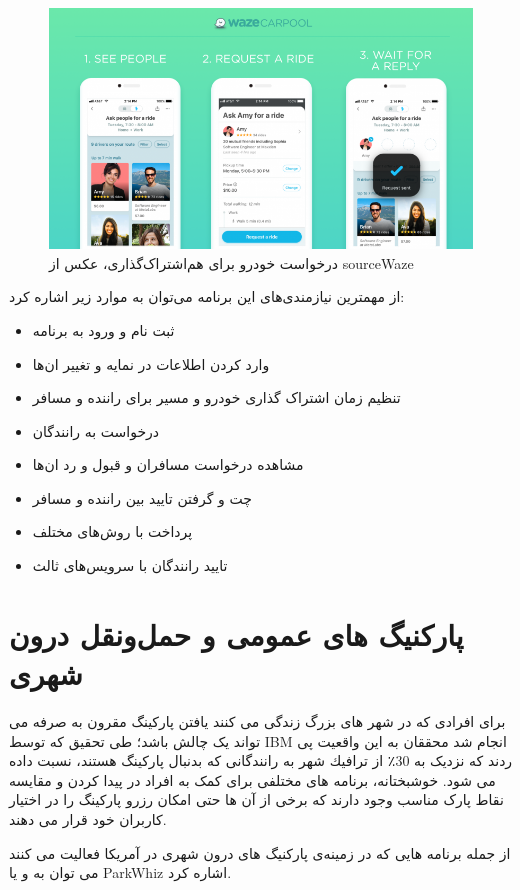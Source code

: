 \begin{figure}[hbt]
\centering
\includegraphics[scale=0.5]{waze1.png}
\caption{درخواست خودرو برای هم‌اشتراک‌گذاری، عکس از sourceWaze}
\label{fig: waze1}
\end{figure}

از مهمترین نیازمندی‌های این برنامه می‌توان به موارد زیر اشاره کرد:

\begin{itemize}
\item
ثبت نام و ورود به برنامه
\item
وارد کردن اطلاعات در نمایه و تغییر ان‌ها
\item
تنظیم زمان اشتراک گذاری خودرو و مسیر برای راننده و مسافر
\item
درخواست به رانندگان 
\item
مشاهده درخواست مسافران و قبول و رد ان‌ها 
\item
چت و گرفتن تایید بین راننده و مسافر
\item 
پرداخت با روش‌های مختلف
\item
تایید رانندگان با سرویس‌های ثالث 
\end{itemize}


\section{پارکنیگ های عمومی و حمل‌و‌نقل درون شهری}
برای افرادی که در شهر های بزرگ زندگی می کنند یافتن پارکینگ مقرون به صرفه می تواند یک چالش باشد؛ طی تحقیق که توسط IBM انجام شد محققان به این واقعیت پی ردند که نزدیک به  30٪ از ترافیك شهر به رانندگانی كه بدنبال پارکینگ هستند، نسبت داده می شود. خوشبختانه، برنامه های مختلفی برای کمک به افراد در پیدا کردن و مقایسه نقاط پارک مناسب وجود دارند که برخی از آن ها حتی امکان رزرو پارکینگ را در اختیار کاربران خود قرار می دهند.

از جمله برنامه هایی که در زمینه‌ی پارکنیگ های درون شهری در آمریکا فعالیت می کنند می توان به  و یا ParkWhiz اشاره کرد.


